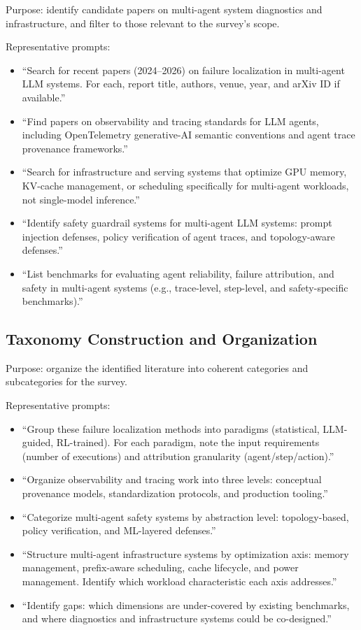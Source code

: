 \documentclass[utf8]{frontiers_suppmat}
\begin{document}
Purpose: identify candidate papers on multi-agent system diagnostics and infrastructure, and filter to those relevant to the survey's scope.

Representative prompts:
\begin{itemize}
  \item ``Search for recent papers (2024--2026) on failure localization in
        multi-agent LLM systems. For each, report title, authors, venue,
        year, and arXiv ID if available.''
  \item ``Find papers on observability and tracing standards for LLM
        agents, including OpenTelemetry generative-AI semantic conventions
        and agent trace provenance frameworks.''
  \item ``Search for infrastructure and serving systems that optimize GPU
        memory, KV-cache management, or scheduling specifically for
        multi-agent workloads, not single-model inference.''
  \item ``Identify safety guardrail systems for multi-agent LLM systems:
        prompt injection defenses, policy verification of agent traces,
        and topology-aware defenses.''
  \item ``List benchmarks for evaluating agent reliability, failure
        attribution, and safety in multi-agent systems (e.g., trace-level,
        step-level, and safety-specific benchmarks).''
\end{itemize}

\subsection{Taxonomy Construction and Organization}

Purpose: organize the identified literature into coherent categories and subcategories for the survey.

Representative prompts:
\begin{itemize}
  \item ``Group these failure localization methods into paradigms
        (statistical, LLM-guided, RL-trained). For each paradigm, note the
        input requirements (number of executions) and attribution
        granularity (agent/step/action).''
  \item ``Organize observability and tracing work into three levels:
        conceptual provenance models, standardization protocols, and
        production tooling.''
  \item ``Categorize multi-agent safety systems by abstraction level:
        topology-based, policy verification, and ML-layered defenses.''
  \item ``Structure multi-agent infrastructure systems by optimization
        axis: memory management, prefix-aware scheduling, cache lifecycle,
        and power management. Identify which workload characteristic each
        axis addresses.''
  \item ``Identify gaps: which dimensions are under-covered by existing
        benchmarks, and where diagnostics and infrastructure systems could
        be co-designed.''
\end{itemize}
\end{document}
